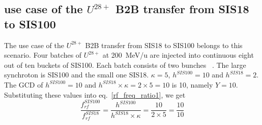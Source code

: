 
\subsection{use case of the $U^{28+}$ B2B transfer from SIS18 to SIS100}
The use case of the $U^{28+}$ B2B transfer from SIS18 to SIS100 belongs to this scenario. Four batches of $U^{28+}$ at \SI{200}{MeV/\atomicmassunit} are injected into continuous eight out of ten buckets of SIS100. Each batch consists of two bunches ~\cite{liebermann_fair_2013, liebermann_sis100_2013}. The large synchroton is SIS100 and the small one SIS18. $\kappa=5$, $h^{\mathit{SIS100}}=10$ and $h^{\mathit{SIS18}}=2$. %
The GCD of $h^{\mathit{SIS100}}=10$ and $h^{\mathit{SIS18}} \times \kappa=2\times 5=10$ is 10, namely $Y=10$. Substituting these values into eq.~\ref{rf_freq_ratio1}, we get
\begin{equation}
\frac{f_{\mathit{rf}}^{\mathit{SIS100}}}{f_{\mathit{rf}}^{\mathit{SIS18}}}= \frac {h^{\mathit{SIS100}}}{h^{\mathit{SIS18}} \times \kappa}= \frac{10}{2 \times 5}=\frac{10}{10}
\end{equation}

